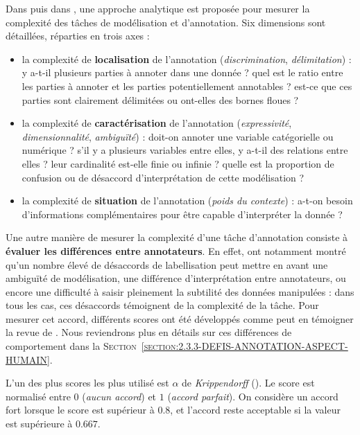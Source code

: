 			Dans \cite{fort-etal:2012:modeling-complexity-manual} puis dans \cite{fort-etal:2012:modeling-complexity-manual}, une approche analytique est proposée pour mesurer la complexité des tâches de modélisation et d'annotation.
			Six dimensions sont détaillées, réparties en trois axes :
			\begin{itemize}
				\item la complexité de \textbf{localisation} de l'annotation (\textit{discrimination}, \textit{délimitation}) :
				y a-t-il plusieurs parties à annoter dans une donnée ?
				quel est le ratio entre les parties à annoter et les parties potentiellement annotables ?
				est-ce que ces parties sont clairement délimitées ou ont-elles des bornes floues ?
				\item la complexité de \textbf{caractérisation} de l'annotation (\textit{expressivité}, \textit{dimensionnalité}, \textit{ambiguïté}) :
				doit-on annoter une variable catégorielle ou numérique ?
				s'il y a plusieurs variables entre elles, y a-t-il des relations entre elles ?
				leur cardinalité est-elle finie ou infinie ?
				quelle est la proportion de confusion ou de désaccord d'interprétation de cette modélisation ?
				\item la complexité de \textbf{situation} de l'annotation (\textit{poids du contexte}) :
				a-t-on besoin d'informations complémentaires pour être capable d'interpréter la donnée ?
			\end{itemize}
			
			Une autre manière de mesurer la complexité d'une tâche d'annotation consiste à \textbf{évaluer les différences entre annotateurs}.
			En effet, \cite{gut-bayerl:2004:measuring-reliability-manual} ont notamment montré qu'un nombre élevé de désaccords de labellisation peut mettre en avant une ambiguïté de modélisation, une différence d'interprétation entre annotateurs, ou encore une difficulté à saisir pleinement la subtilité des données manipulées : dans tous les cas, ces désaccords témoignent de la complexité de la tâche.
			Pour mesurer cet accord, différents scores ont été développés comme peut en témoigner la revue de \cite{artstein-poesio:2008:intercoder-agreement-computational}.
			Nous reviendrons plus en détails sur ces différences de comportement dans la \textsc{Section~\ref{section:2.3.3-DEFIS-ANNOTATION-ASPECT-HUMAIN}}.
			\begin{leftBarInformation}
				L'un des plus scores les plus utilisé est $\alpha$ de \textit{Krippendorff} (\cite{krippendorff:2004:content-analysis-introduction}).
				Le score est normalisé entre $0$ (\textit{aucun accord}) et $1$ (\textit{accord parfait}).
				On considère un accord fort lorsque le score est supérieur à $0.8$,
				et l'accord reste acceptable si la valeur est supérieure à $0.667$.
			\end{leftBarInformation}
			
